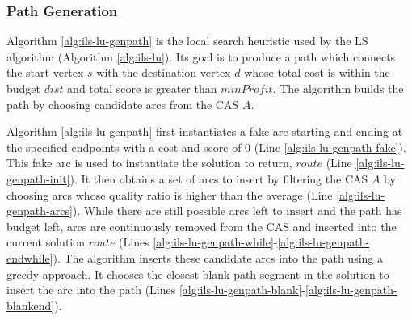 \documentclass[honors]{union-cs-thesis}
\begin{document}
\subsubsection{Path Generation}
Algorithm \ref{alg:ils-lu-genpath} is the local search heuristic used by the LS algorithm (Algorithm \ref{alg:ils-lu}). Its goal is to produce a path which connects the start vertex $s$ with the destination vertex $d$ whose total cost is within the budget $dist$ and total score is greater than $minProfit$. The algorithm builds the path by choosing candidate arcs from the CAS $A$.

Algorithm \ref{alg:ils-lu-genpath} first instantiates a fake arc starting and ending at the specified endpoints with a cost and score of 0 (Line \ref{alg:ils-lu-genpath-fake}). This fake arc is used to instantiate the solution to return, $route$ (Line \ref{alg:ils-lu-genpath-init}). It then obtains a set of arcs to insert by filtering the CAS $A$ by choosing arcs whose quality ratio is higher than the average (Line \ref{alg:ils-lu-genpath-arcs}). While there are still possible arcs left to insert and the path has budget left, arcs are continuously removed from the CAS and inserted into the current solution $route$ (Lines \ref{alg:ils-lu-genpath-while}-\ref{alg:ils-lu-genpath-endwhile}). The algorithm inserts these candidate arcs into the path using a greedy approach. It chooses the closest blank path segment in the solution to insert the arc into the path (Lines \ref{alg:ils-lu-genpath-blank}-\ref{alg:ils-lu-genpath-blankend}).
\end{document}

